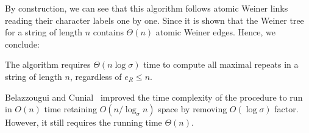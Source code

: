 By construction, we can see that this algorithm follows atomic Weiner links reading their character labels one by one. Since it is shown that the Weiner tree for a string of length $n$ contains $\Theta(n)$ atomic Weiner edges. Hence, we conclude: 

\begin{remark}
\label{rem:lb:tdbw}    
  The algorithm \TDBW{} requires $\Theta(n\log\sigma)$ time to compute all maximal repeats in a string of length $n$, regardless of $e_R \le n$. 
\end{remark}

Belazzougui and Cunial~\cite{belazzougui2015space:unusual} improved the time complexity of the procedure \TDBW{} to run in $O(n)$ time retaining $O(n/\log_\sigma n)$ space by removing $O(\log\sigma)$ factor. However, it still requires the running time $\Theta(n)$. 
